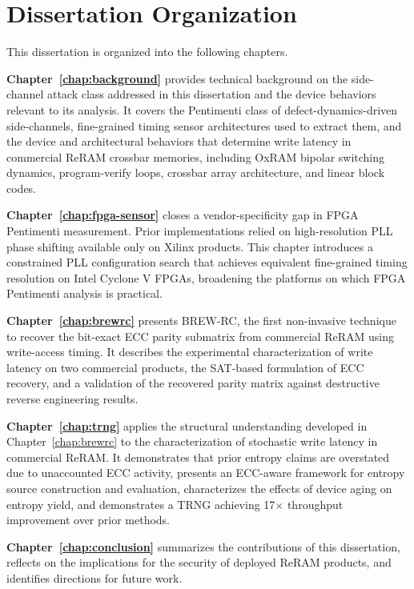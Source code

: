 \section{Dissertation Organization}
\label{sec:organization} This dissertation is organized into the
following chapters.

\textbf{Chapter~\ref{chap:background}} provides technical background on
the side-channel attack class addressed in this dissertation and the
device behaviors relevant to its analysis. It covers the Pentimenti
class of defect-dynamics-driven side-channels, fine-grained timing
sensor architectures used to extract them, and the device and
architectural behaviors that determine write latency in commercial ReRAM
crossbar memories, including OxRAM bipolar switching dynamics,
program-verify loops, crossbar array architecture, and linear block
codes.

\textbf{Chapter~\ref{chap:fpga-sensor}} closes a vendor-specificity gap
in FPGA Pentimenti measurement. Prior implementations relied on
high-resolution PLL phase shifting available only on Xilinx products.
This chapter introduces a constrained PLL configuration search that
achieves equivalent fine-grained timing resolution on Intel Cyclone V
FPGAs, broadening the platforms on which FPGA Pentimenti analysis is
practical.

\textbf{Chapter~\ref{chap:brewrc}} presents BREW-RC, the first
non-invasive technique to recover the bit-exact ECC parity submatrix
from commercial ReRAM using write-access timing. It describes the
experimental characterization of write latency on two commercial
products, the SAT-based formulation of ECC recovery, and a validation of
the recovered parity matrix against destructive reverse engineering
results.

\textbf{Chapter~\ref{chap:trng}} applies the structural understanding
developed in Chapter~\ref{chap:brewrc} to the characterization of
stochastic write latency in commercial ReRAM. It demonstrates that prior
entropy claims are overstated due to unaccounted ECC activity, presents
an ECC-aware framework for entropy source construction and evaluation,
characterizes the effects of device aging on entropy yield, and
demonstrates a TRNG achieving 17$\times$ throughput improvement over
prior methods.

\textbf{Chapter~\ref{chap:conclusion}} summarizes the contributions of
this dissertation, reflects on the implications for the security of
deployed ReRAM products, and identifies directions for future work.